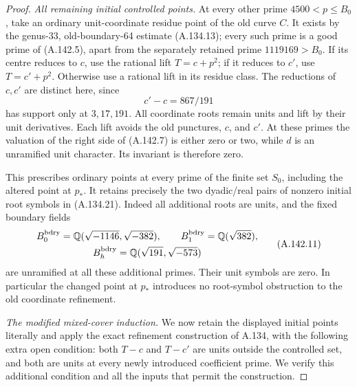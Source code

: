 \begin{proof}
\emph{All remaining initial controlled points.}
At every other prime \(4500<p\le B_0\), take an ordinary
unit-coordinate residue point of the old curve \(C\).
It exists by the genus-33, old-boundary-64 estimate
(A.134.13); every such prime is a good prime of (A.142.5), apart
from the separately retained prime \(1119169>B_0\).
If its centre reduces to \(c\), use the rational lift
\(T=c+p^2\); if it reduces to \(c'\), use \(T=c'+p^2\).
Otherwise use a rational lift in its residue class.
The reductions of \(c,c'\) are distinct here, since
\[
                         c'-c=867/191
\tag{A.142.10}
\]
has support only at \(3,17,191\).
All coordinate roots remain units and lift by their unit
derivatives.  Each lift avoids the old punctures, \(c\), and
\(c'\).  At these primes the valuation of the right side of
(A.142.7) is either zero or two, while \(d\) is an unramified
unit character.  Its invariant is therefore zero.

This prescribes ordinary points at every prime of the finite set
\(S_0\), including the altered point at \(p_*\).
It retains precisely the two dyadic/real pairs of nonzero initial
root symbols in (A.134.21).  Indeed all additional roots are units,
and the fixed boundary fields
\[
 \begin{gathered}
 B_0^{\rm bdry}=\mathbb Q(\sqrt{-1146},\sqrt{-382}),\qquad
 B_1^{\rm bdry}=\mathbb Q(\sqrt{382}),\\
 B_h^{\rm bdry}=\mathbb Q(\sqrt{191},\sqrt{-573})
 \end{gathered}
\tag{A.142.11}
\]
are unramified at all these additional primes.
Their unit symbols are zero.  In particular the changed point
at \(p_*\) introduces no root-symbol obstruction to the old
coordinate refinement.

\emph{The modified mixed-cover induction.}
We now retain the displayed initial points literally and apply
the exact refinement construction of A.134, with the following
extra open condition: both \(T-c\) and \(T-c'\) are units
outside the controlled set, and both are units at every newly
introduced coefficient prime.  We verify this additional condition
and all the inputs that permit the construction.


\end{proof}
